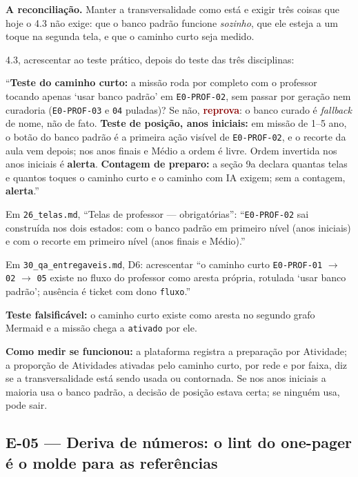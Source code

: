 \documentclass[11pt,a4paper]{article}
\newcommand{\rep}{\textcolor{DarkRed}{\textbf{reprova}}}
\newcommand{\alerta}{\textcolor{DarkYellow}{\textbf{alerta}}}
\begin{document}
\textbf{A reconciliação.} Manter a transversalidade como está e exigir três coisas que hoje o 4.3
não exige: que o banco padrão funcione \emph{sozinho}, que ele esteja a um toque na segunda tela, e
que o caminho curto seja medido.

\begin{depoisbox}\small
4.3, acrescentar ao teste prático, depois do teste das três disciplinas:

``\textbf{Teste do caminho curto:} a missão roda por completo com o professor tocando apenas
`usar banco padrão' em \texttt{E0-PROF-02}, sem passar por geração nem curadoria (\texttt{E0-PROF-03}
e \texttt{04} puladas)? Se não, \rep: o banco curado é \emph{fallback} de nome, não de fato.
\textbf{Teste de posição, anos iniciais:} em missão de 1\textordmasculine{}--5\textordmasculine{} ano,
o botão do banco padrão é a primeira ação visível de \texttt{E0-PROF-02}, e o recorte da aula vem
depois; nos anos finais e Médio a ordem é livre. Ordem invertida nos anos iniciais é \alerta.
\textbf{Contagem de preparo:} a seção 9a declara quantas telas e quantos toques o caminho curto e o
caminho com IA exigem; sem a contagem, \alerta.''

Em \texttt{26\_telas.md}, ``Telas de professor --- obrigatórias'': ``\texttt{E0-PROF-02} sai
construída nos dois estados: com o banco padrão em primeiro nível (anos iniciais) e com o recorte em
primeiro nível (anos finais e Médio).''

Em \texttt{30\_qa\_entregaveis.md}, D6: acrescentar ``o caminho curto \texttt{E0-PROF-01} $\to$ \texttt{02} $\to$ \texttt{05}
existe no fluxo do professor como aresta própria, rotulada `usar banco padrão'; ausência é ticket
com dono \texttt{fluxo}.''
\end{depoisbox}

\textbf{Teste falsificável:} o caminho curto existe como aresta no segundo grafo Mermaid e a
missão chega a \texttt{ativado} por ele.

\textbf{Como medir se funcionou:} a plataforma registra a preparação por Atividade; a proporção de
Atividades ativadas pelo caminho curto, por rede e por faixa, diz se a transversalidade está sendo
usada ou contornada. Se nos anos iniciais a maioria usa o banco padrão, a decisão de posição estava
certa; se ninguém usa, pode sair.

\subsection{E-05 --- Deriva de números: o lint do one-pager é o molde para as referências}
\label{sec:e05}
\end{document}
